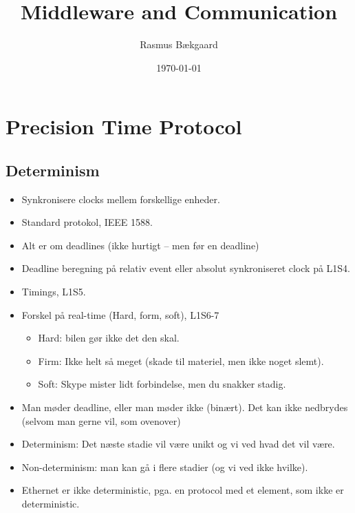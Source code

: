\documentclass[oneside, 10pt]{article}
\title{Middleware and Communication}
\author{Rasmus Bækgaard}
\date{\today}
\begin{document}
\maketitle

\section{Precision Time Protocol}

\subsection{Determinism}
\begin{itemize}
	\item Synkronisere clocks mellem forskellige enheder.
	\item Standard protokol, IEEE 1588.
	\item Alt er om deadlines (ikke hurtigt -- men før en deadline)
	\item Deadline beregning på relativ event eller absolut synkroniseret clock på L1S4.
	\item Timings, L1S5.
	\item Forskel på real-time (Hard, form, soft), L1S6-7
	\begin{itemize}
		\item Hard: bilen gør ikke det den skal.
		\item Firm: Ikke helt så meget (skade til materiel, men ikke noget slemt).
		\item Soft: Skype mister lidt forbindelse, men du snakker stadig.
	\end{itemize}

	\item Man møder deadline, eller man møder ikke (binært). Det kan ikke nedbrydes (selvom man gerne vil, som ovenover)
	\item Determinism: Det næste stadie vil være unikt og vi ved hvad det vil være.
	\item Non-determinism: man kan gå i flere stadier (og vi ved ikke hvilke).

	\item Ethernet er ikke deterministic, pga. en protocol med et element, som ikke er deterministic.
\end{itemize}
\end{document}
